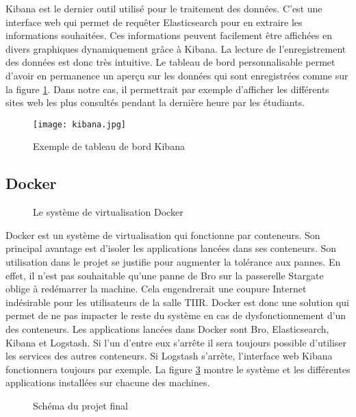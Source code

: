 Kibana est le dernier outil utilisé pour le traitement des données. C'est une interface web qui permet de requêter Elasticsearch pour en extraire les informations souhaitées. Ces informations peuvent facilement être affichées en divers graphiques dynamiquement grâce à Kibana. La lecture de l'enregistrement des données est donc très intuitive. Le tableau de bord personnalisable permet d'avoir en permanence un aperçu sur les données qui sont enregistrées comme sur la figure \ref{kibana}. Dans notre cas, il permettrait par exemple d'afficher les différents sites web les plus consultés pendant la dernière heure par les étudiants.

\begin{figure}[!h]
\centering
\texttt{[image: kibana.jpg]}
\caption{Exemple de tableau de bord Kibana}
\label{kibana}
\end{figure}

\subsection{Docker}

\begin{figure}[!h]
\centering
\def\svgwidth{0.5\columnwidth}

\caption{Le système de virtualisation Docker}
\label{docker}
\end{figure}

Docker est un système de virtualisation qui fonctionne par conteneurs. Son principal avantage est d'isoler les applications lancées dans ses conteneurs. Son utilisation dans le projet se justifie pour augmenter la tolérance aux pannes. En effet, il n'est pas souhaitable qu'une panne de Bro sur la passerelle Stargate oblige à redémarrer la machine. Cela engendrerait une coupure Internet indésirable pour les utilisateurs de la salle TIIR. Docker est donc une solution qui permet de ne pas impacter le reste du système en cas de dysfonctionnement d'un des conteneurs. Les applications lancées dans Docker sont Bro, Elasticsearch, Kibana et Logstash. Si l'un d'entre eux s'arrête il sera toujours possible d'utiliser les services des autres conteneurs. Si Logstash s'arrête, l'interface web Kibana fonctionnera toujours par exemple. La figure \ref{projet_final} montre le système et les différentes applications installées sur chacune des machines.

\begin{figure}[!h]
\centering
\def\svgwidth{\columnwidth}

\caption{Schéma du projet final}
\label{projet_final}
\end{figure}


